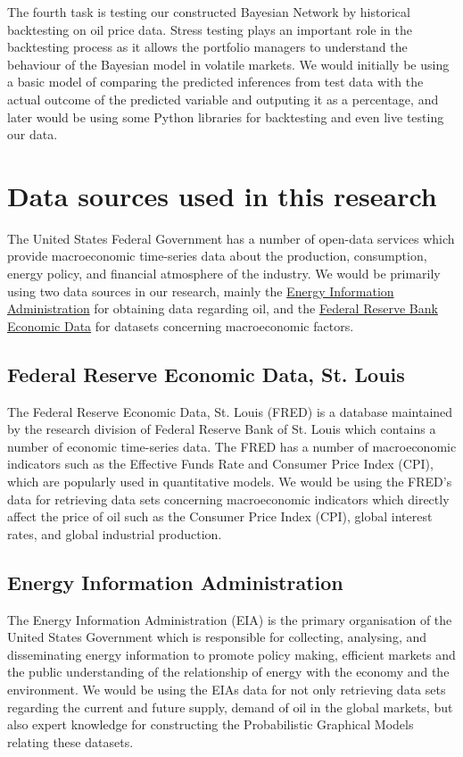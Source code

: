 The fourth task is testing our constructed Bayesian Network by historical backtesting on oil price data. Stress testing \cite{Rebonato2009} plays an important role in the backtesting process as it allows the portfolio managers to understand the behaviour of the Bayesian model in volatile markets. We would initially be using a basic model of comparing the predicted inferences from test data with the actual outcome of the predicted variable and outputing it as a percentage, and later would be using some Python libraries for backtesting and even live testing our data.

\section{Data sources used in this research}

The United States Federal Government \cite{united2017statistical} has a number of open-data services which provide macroeconomic time-series data about the production, consumption, energy policy, and financial atmosphere of the industry. We would be primarily using two data sources in our research, mainly the \href{https://www.eia.gov/}{Energy Information Administration} for obtaining data regarding oil, and the \href{https://fred.stlouisfed.org/}{Federal Reserve Bank Economic Data} for datasets concerning macroeconomic factors. 

\subsection{Federal Reserve Economic Data, St. Louis}

The Federal Reserve Economic Data, St. Louis (FRED) is a database maintained by the research division of Federal Reserve Bank of St. Louis which contains a number of economic time-series data. The FRED has a number of macroeconomic indicators such as the Effective Funds Rate and Consumer Price Index (CPI), which are popularly used in quantitative models. We would be using the FRED's data for retrieving data sets concerning macroeconomic indicators which directly affect the price of oil such as the Consumer Price Index (CPI), global interest rates, and global industrial production.

\subsection{Energy Information Administration}

The Energy Information Administration (EIA) is the primary organisation of the United States Government which is responsible for collecting, analysing, and disseminating energy information to promote policy making, efficient markets and the public understanding of the relationship of energy with the economy and the environment. We would be using the EIAs data for not only retrieving data sets regarding the current and future supply, demand of oil in the global markets, but also expert knowledge for constructing the Probabilistic Graphical Models relating these datasets.



